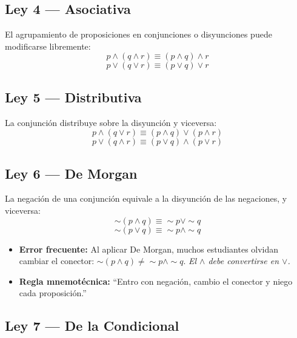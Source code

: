 \subsection{Ley 4 — Asociativa}

\begin{cajaprop}[4 — Asociativa]
  El agrupamiento de proposiciones en conjunciones o disyunciones puede
  modificarse libremente:
  \[
    p \wedge (q \wedge r) \equiv (p \wedge q) \wedge r
  \]
  \[
    p \vee (q \vee r) \equiv (p \vee q) \vee r
  \]
\end{cajaprop}

\subsection{Ley 5 — Distributiva}

\begin{cajaprop}[5 — Distributiva]
  La conjunción distribuye sobre la disyunción y viceversa:
  \[
    p \wedge (q \vee r) \equiv (p \wedge q) \vee (p \wedge r)
  \]
  \[
    p \vee (q \wedge r) \equiv (p \vee q) \wedge (p \vee r)
  \]
\end{cajaprop}

\subsection{Ley 6 — De Morgan}

\begin{cajaprop}[6 — De Morgan]
  La negación de una conjunción equivale a la disyunción de las
  negaciones, y viceversa:
  \[
    \sim(p \wedge q) \equiv \sim p \vee \sim q
  \]
  \[
    \sim(p \vee q) \equiv \sim p \wedge \sim q
  \]
\end{cajaprop}

\begin{cajaadvert}
  \begin{itemize}
    \item \textbf{Error frecuente:} Al aplicar De Morgan, muchos estudiantes
      olvidan cambiar el conector: $\sim(p \wedge q) \neq \sim p \wedge \sim q$.
      \textit{El $\wedge$ debe convertirse en $\vee$.}
    \item \textbf{Regla mnemotécnica:} ``Entro con negación, cambio el
      conector y niego cada proposición.''
  \end{itemize}
\end{cajaadvert}

\subsection{Ley 7 — De la Condicional}

